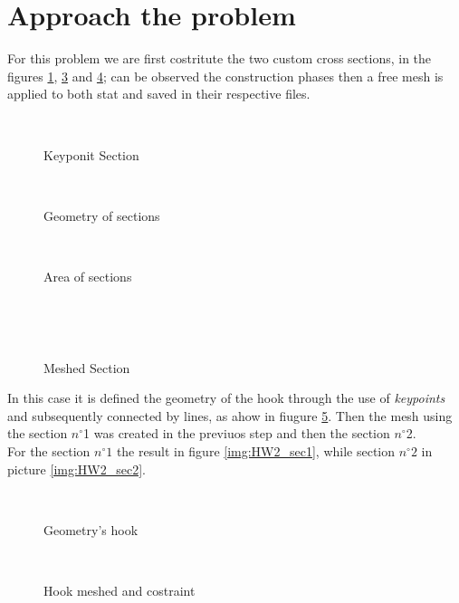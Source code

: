 \section{Approach the problem}
For this problem we are first costritute the two custom cross sections, in the figures \ref{img:HW2-KeySection}, \ref{img:HW2-AREASection} and \ref{img:HW2-MeshSection}; can be observed the construction phases then a free mesh is applied to both stat and saved in their respective files.
\begin{figure}[!h]
\centering
{}\,
\caption{Keyponit Section}
\label{img:HW2-KeySection}
\end{figure}
\begin{figure}[!h]
\centering
{}\,
\caption{Geometry of sections}
\label{img:HW2-GeomSection}
\end{figure}
\begin{figure}[!h]
\centering
{}\,
\caption{Area of sections}
\label{img:HW2-AREASection}
\end{figure}
\pagebreak\\
\begin{figure}[!h]
\centering
{}\,
\caption{Meshed Section}
\label{img:HW2-MeshSection}
\end{figure}\noindent
In this case it is defined the geometry of the hook through the use of \emph{keypoints} and subsequently connected by lines, as ahow in fiugure \ref{img:HW2-Geometry}.
Then the mesh using the section $n^{\circ}$1 was created in the previuos step and then the section $n^{\circ}$2.\\
For the section $n^{\circ} 1$ the result in figure \ref{img:HW2_sec1}, while section $n^{\circ} 2$ in picture \ref{img:HW2_sec2}.
\begin{figure}[!h]
\centering 
{}\,
\caption{Geometry's hook}
\label{img:HW2-Geometry}
\end{figure}
\begin{figure}[!h]
\centering 
{}\,
\caption{Hook meshed and costraint}
\label{img:HW2-Mesh+Costraint}
\end{figure}
